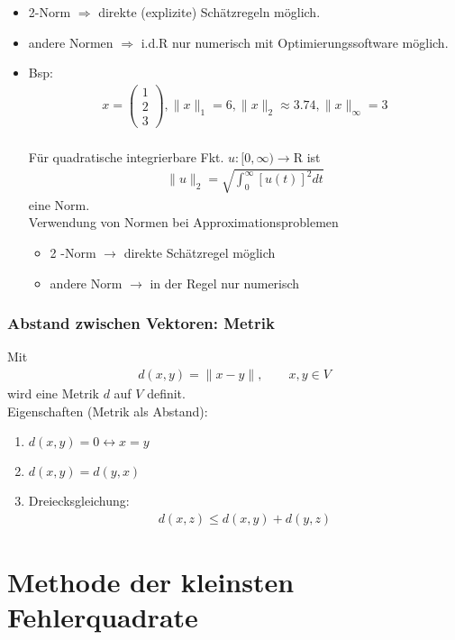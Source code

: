 \documentclass[ngerman]{tudscrreprt}
\begin{document}
		\begin{itemize}
		\item 2-Norm $\Rightarrow$ direkte (explizite) Schätzregeln möglich.
		\item andere Normen $\Rightarrow$ i.d.R nur numerisch mit Optimierungssoftware möglich.

		\item Bsp: \begin{align*}
		x = \begin{pmatrix}
		1\\ 2\\ 3
		\end{pmatrix}, \|x\|_1 = 6, \| x\|_2 \approx 3.74, \|x\|_{\infty} = 3
		\end{align*}\\ 
		Für quadratische integrierbare Fkt. $u:[0, \infty) \to \mathrm{R}$ ist \begin{align*}
		\|u\|_2 = \sqrt{\int_0^{\infty} [u(t)]^2 dt}
		\end{align*}
		eine Norm.\\
		Verwendung von Normen bei Approximationsproblemen \begin{itemize}
		\item 2 -Norm $\to$ direkte Schätzregel möglich
		\item andere Norm $\to$ in der Regel nur numerisch
		\end{itemize}
		\end{itemize}
\subsection{Abstand zwischen Vektoren: Metrik}
Mit \begin{align*}d(x,y) = \|x - y\| , \qquad x,y \in V \end{align*}
wird eine Metrik $d$ auf $V$ definit.\\ 
Eigenschaften (Metrik als Abstand):
\begin{enumerate}
\item $d(x,y) = 0 \leftrightarrow x=y$
\item $d(x,y) = d(y,x)$
\item Dreiecksgleichung:\begin{align*}
d(x,z) \le d(x,y) + d(y,z)
\end{align*}
\end{enumerate}
\chapter{Methode der kleinsten Fehlerquadrate}
\end{document}
